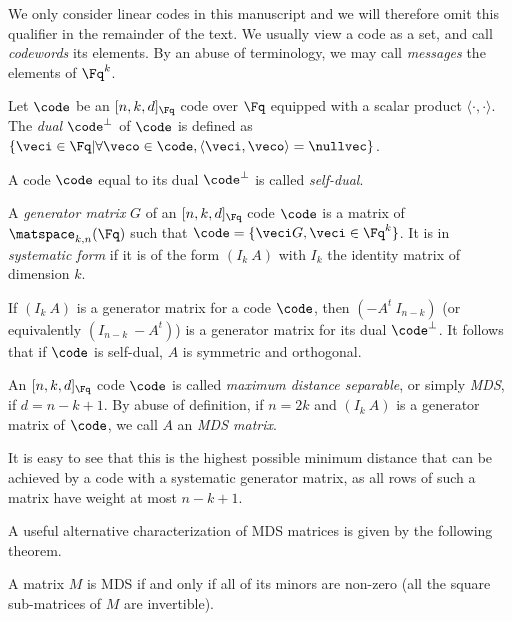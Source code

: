 We only consider linear codes in this manuscript and we will therefore omit this qualifier in the remainder of the text. 
We usually view a code as a set, and call \emph{codewords} its elements. By an abuse of terminology, we may call \emph{messages} the elements of $\Fq^k$.

\begin{defi}
Let $\code$ be an $[n, k, d]_{\Fq}$ code over $\Fq$ equipped with a scalar product $\langle\cdot,\cdot\rangle$. The \emph{dual}
$\code^\bot$ of $\code$ is defined as $\{\veci \in \Fq | \forall \veco \in \code, \langle\veci,\veco\rangle = \nullvec\}$.
\end{defi}

A code $\code$ equal to its dual $\code^\bot$ is called \emph{self-dual}.


\begin{defi}
A \emph{generator matrix} $G$ of an $[n, k, d]_{\Fq}$ code $\code$ is a matrix of $\matspace_{k,n}(\Fq)$ such that
$\code = \{\veci G, \veci \in \Fq^k\}$. It is in \emph{systematic form} if it is of the form $(I_k~A)$ with
$I_k$ the identity matrix of dimension $k$. 
\end{defi}

If $(I_k~A)$ is a generator matrix for a code $\code$, then $(-A^t~I_{n-k})$ (or equivalently $(I_{n-k}~-A^t)$)
is a generator matrix for its dual $\code^\bot$. It follows that if $\code$ is self-dual, $A$ is symmetric and
orthogonal.

\begin{defi}
An $[n,k,d]_{\Fq}$ code $\code$ is called \emph{maximum distance separable}, or simply \emph{MDS}, if $d = n - k + 1$.
By abuse of definition, if $n = 2k$ and $(I_k~A)$ is a generator matrix of $\code$, we call $A$ an \emph{MDS matrix}.
\end{defi}

It is easy to see that this is the highest possible minimum distance that can be achieved by a code with a
systematic generator matrix, as all rows of such a matrix have weight at most $n - k + 1$.

A useful alternative characterization of MDS matrices is given by the following theorem.

\begin{thm}
\label{thm:mds_minors}
A matrix $M$ is MDS if and only if all of its minors are non-zero (\ie all the square sub-matrices of $M$ are invertible).
\end{thm}

